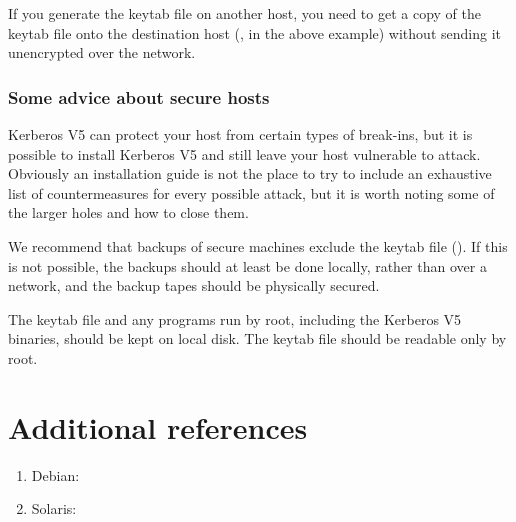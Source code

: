 \documentclass[letterpaper,10pt,english]{sphinxmanual}
\begin{document}
If you generate the keytab file on another host, you need to get a
copy of the keytab file onto the destination host (, in
the above example) without sending it unencrypted over the network.


\subsubsection{Some advice about secure hosts}
\label{\detokenize{admin/install_appl_srv:some-advice-about-secure-hosts}}
Kerberos V5 can protect your host from certain types of break-ins, but
it is possible to install Kerberos V5 and still leave your host
vulnerable to attack.  Obviously an installation guide is not the
place to try to include an exhaustive list of countermeasures for
every possible attack, but it is worth noting some of the larger holes
and how to close them.

We recommend that backups of secure machines exclude the keytab file
({\hyperref[\detokenize{mitK5defaults:paths}]{}}).  If this is not possible, the backups should at least be
done locally, rather than over a network, and the backup tapes should
be physically secured.

The keytab file and any programs run by root, including the Kerberos
V5 binaries, should be kept on local disk.  The keytab file should be
readable only by root.


\section{Additional references}
\label{\detokenize{admin/install:additional-references}}\begin{enumerate}
\item {} 
Debian: 

\item {} 
Solaris: 

\end{enumerate}
\end{document}
